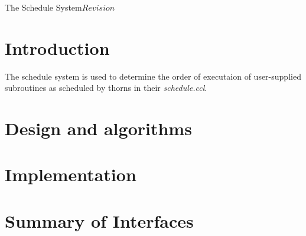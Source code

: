 %   

\begin{cactuspart}{9}{The Schedule System}{}{$Revision$}
\renewcommand{\thepage}{\Alph{part}\arabic{page}}

\chapter{Introduction}

The schedule system is used to determine the order of executaion of
user-supplied subroutines as scheduled by thorns in their {\em schedule.ccl}.

\chapter{Design and algorithms}

\chapter{Implementation}

\chapter{Summary of Interfaces}

\end{cactuspart}
